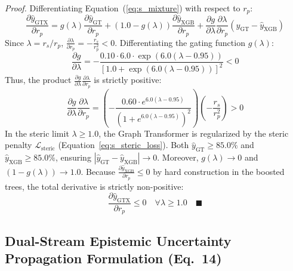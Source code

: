 \documentclass[11pt]{article}
\begin{document}
\noindent\textit{Proof.} Differentiating Equation~(\ref{eq:s_mixture}) with respect to $r_p$:
\begin{equation}
\frac{\partial \hat{y}_{\mathrm{GTX}}}{\partial r_p} = g(\lambda) \frac{\partial \hat{y}_{\mathrm{GT}}}{\partial r_p} + \left(1.0 - g(\lambda)\right) \frac{\partial \hat{y}_{\mathrm{XGB}}}{\partial r_p} + \frac{\partial g}{\partial \lambda} \frac{\partial \lambda}{\partial r_p} \left( \hat{y}_{\mathrm{GT}} - \hat{y}_{\mathrm{XGB}} \right)
\label{eq:s_diff_proof}
\end{equation}
Since $\lambda = r_s / r_p$, $\frac{\partial \lambda}{\partial r_p} = -\frac{r_s}{r_p^2} < 0$. Differentiating the gating function $g(\lambda)$:
\begin{equation}
\frac{\partial g}{\partial \lambda} = -\frac{0.10 \cdot 6.0 \cdot \exp\left(6.0(\lambda - 0.95)\right)}{\left[ 1.0 + \exp\left(6.0(\lambda - 0.95)\right) \right]^2} < 0
\label{eq:s_dg_dlambda}
\end{equation}
Thus, the product $\frac{\partial g}{\partial \lambda} \frac{\partial \lambda}{\partial r_p}$ is strictly positive:
\begin{equation}
\frac{\partial g}{\partial \lambda} \frac{\partial \lambda}{\partial r_p} = \left( -\frac{0.60 \cdot e^{6.0(\lambda - 0.95)}}{\left(1 + e^{6.0(\lambda - 0.95)}\right)^2} \right) \left( -\frac{r_s}{r_p^2} \right) > 0
\end{equation}
In the steric limit $\lambda \ge 1.0$, the Graph Transformer is regularized by the steric penalty $\mathcal{L}_{\mathrm{steric}}$ (Equation~\ref{eq:s_steric_loss}). Both $\hat{y}_{\mathrm{GT}} \ge 85.0\%$ and $\hat{y}_{\mathrm{XGB}} \ge 85.0\%$, ensuring $|\hat{y}_{\mathrm{GT}} - \hat{y}_{\mathrm{XGB}}| \to 0$. Moreover, $g(\lambda) \to 0$ and $(1 - g(\lambda)) \to 1.0$. Because $\frac{\partial \hat{y}_{\mathrm{XGB}}}{\partial r_p} \le 0$ by hard construction in the boosted trees, the total derivative is strictly non-positive:
\begin{equation}
\frac{\partial \hat{y}_{\mathrm{GTX}}}{\partial r_p} \le 0 \quad \forall \lambda \ge 1.0 \quad \blacksquare
\end{equation}

\subsection{Dual-Stream Epistemic Uncertainty Propagation Formulation (Eq.~14)}
\label{sec:mixture_and_uq_derivation}
\end{document}
